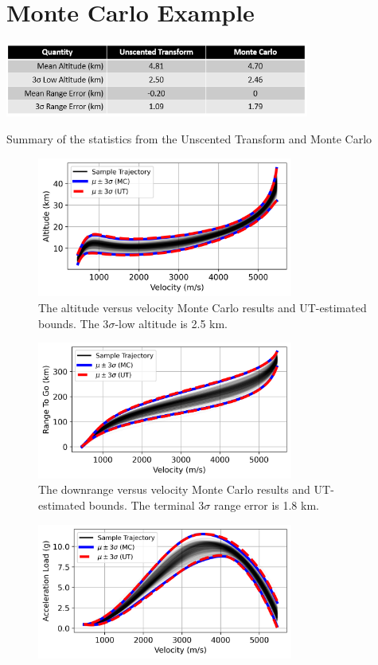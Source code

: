 \documentclass[journal ]{new-aiaa}
\begin{document}
\section*{Monte Carlo Example}
\begin{table}[h!]
	\centering
	\includegraphics[width=0.75\textwidth]{ddp/table_mc}
	\caption{Summary of the statistics from the Unscented Transform and Monte Carlo}
	\label{table_mc}
\end{table}
\begin{figure}[h!]
	\centering
	\includegraphics[width=0.75\textwidth]{ddp/python/Altitude}
	\caption{The altitude versus velocity Monte Carlo results and UT-estimated bounds. The 3$ \sigma $-low altitude is 2.5 km.}
	\label{fig_mc_alt}
\end{figure}
\begin{figure}[h!]
	\centering
	\includegraphics[width=0.75\textwidth]{ddp/python/Range}
	\caption{The downrange versus velocity Monte Carlo results and UT-estimated bounds. The terminal 3$ \sigma $ range error is 1.8 km.}
	\label{fig_mc_range}
\end{figure}
\begin{figure}[h!]
	\centering
	\includegraphics[width=0.75\textwidth]{ddp/python/Acceleration}
	\caption{}
	\label{fig_mc_accel}
\end{figure}
\end{document}

